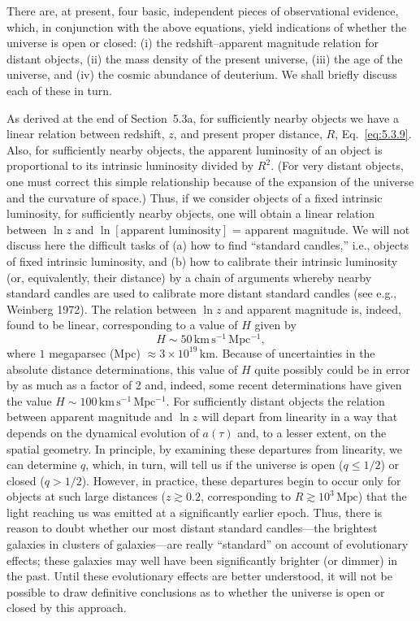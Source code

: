 There are, at present, four basic, independent pieces of observational evidence, which,
in conjunction with the above equations, yield indications of whether the universe is
open or closed: (i) the redshift--apparent magnitude relation for distant objects, (ii)
the mass density of the present universe, (iii) the age of the universe, and (iv) the
cosmic abundance of deuterium. We shall briefly discuss each of these in turn.

As derived at the end of Section~5.3a, for sufficiently nearby objects we have a
linear relation between redshift, \(z\), and present proper distance, \(R\),
Eq.~\eqref{eq:5.3.9}. Also, for sufficiently nearby objects, the apparent luminosity of
an object is proportional to its intrinsic luminosity divided by \(R^2\). (For very
distant objects, one must correct this simple relationship because of the expansion of
the universe and the curvature of space.) Thus, if we consider objects of a fixed
intrinsic luminosity, for sufficiently nearby objects, one will obtain a linear relation
between \(\ln z\) and \(\ln[\text{apparent luminosity}]\) = apparent magnitude. We
will not discuss here the difficult tasks of (a) how to find ``standard candles,'' i.e.,
objects of fixed intrinsic luminosity, and (b) how to calibrate their intrinsic luminosity
(or, equivalently, their distance) by a chain of arguments whereby nearby standard
candles are used to calibrate more distant standard candles (see e.g., Weinberg 1972).
The relation between \(\ln z\) and apparent magnitude is, indeed, found to be linear,
corresponding to a value of \(H\) given by
\begin{equation}
  H\sim50\,\mathrm{km\,s^{-1}\,Mpc^{-1}},
  \tag{5.4.10}\label{eq:5.4.10}
\end{equation}
where \(1\) megaparsec (Mpc) \(\approx3\times10^{19}\,\mathrm{km}\). Because of
uncertainties in the absolute distance determinations, this value of \(H\) quite
possibly could be in error by as much as a factor of 2 and, indeed, some recent
determinations have given the value \(H\sim100\,\mathrm{km\,s^{-1}\,Mpc^{-1}}\). For
sufficiently distant objects the relation between apparent magnitude and \(\ln z\) will
depart from linearity in a way that depends on the dynamical evolution of \(a(\tau)\)
and, to a lesser extent, on the spatial geometry. In principle, by examining these
departures from linearity, we can determine \(q\), which, in turn, will tell us if the
universe is open (\(q\leq1/2\)) or closed (\(q>1/2\)). However, in practice, these
departures begin to occur only for objects at such large distances
(\(z\gtrsim0.2\), corresponding to \(R\gtrsim10^3\,\mathrm{Mpc}\)) that the light
reaching us was emitted at a significantly earlier epoch. Thus, there is reason to doubt
whether our most distant standard candles---the brightest galaxies in clusters of
galaxies---are really ``standard'' on account of evolutionary effects; these galaxies may
well have been significantly brighter (or dimmer) in the past. Until these evolutionary
effects are better understood, it will not be possible to draw definitive conclusions as
to whether the universe is open or closed by this approach.

